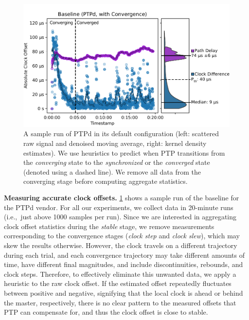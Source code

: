 \begin{figure}
    \includegraphics[width=\linewidth]{res/generated/base/rpi08-convergence_2.pdf}
    \caption{A sample run of PTPd in its default configuration (left: scattered
    raw signal and denoised moving average, right: kernel density estimates).
    We use heuristics to predict when PTP transitions from the
    \textit{converging} state to the \textit{synchronized} or the
    \textit{converged} state (denoted using a dashed line).
    We remove all data from the converging stage before computing aggregate
    statistics.}  
    \label{fig:baseline_sample}
\end{figure}

\textbf{Measuring accurate clock offsets.}
\cref{fig:baseline_sample} shows a sample run of the baseline for the
PTPd vendor.
For all our experiments, we collect data in 20-minute runs
(i.e.,~just above 1000 samples per run).
Since we are interested in aggregating clock offset statistics during the
\textit{stable} stage,
we remove measurements corresponding to the convergence stages
(\textit{clock step} and \textit{clock slew}),
which may skew the results otherwise.
However, the clock travels on a different trajectory during each trial,
and each convergence trajectory may take different amounts of time, have
different final magnitudes, and include discontinuities, rebounds, and
clock steps.
Therefore, to effectively eliminate this unwanted data,
we apply a heuristic to the raw clock offset.
If the estimated offset repeatedly fluctuates between positive and negative,
signifying that the local clock is ahead or behind the master, respectively,
there is no clear pattern to the measured offsets that PTP can compensate for,
and thus the clock offset is close to stable.


